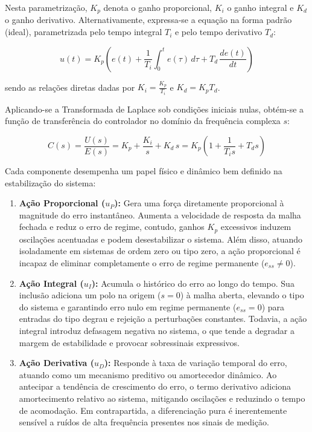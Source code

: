 Nesta parametrização, $K_p$ denota o ganho proporcional, $K_i$ o ganho integral e $K_d$ o ganho derivativo. Alternativamente, expressa-se a equação na forma padrão (ideal), parametrizada pelo tempo integral $T_i$ e pelo tempo derivativo $T_d$:

\begin{equation}
    u(t) = K_p \left( e(t) + \frac{1}{T_i} \int_{0}^{t} e(\tau) \, d\tau + T_d \, \frac{de(t)}{dt} \right)
    \label{eq:pid_padrao}
\end{equation}

\noindent sendo as relações diretas dadas por $K_i = \frac{K_p}{T_i}$ e $K_d = K_p T_d$.

Aplicando-se a Transformada de Laplace sob condições iniciais nulas, obtém-se a função de transferência do controlador no domínio da frequência complexa $s$:

\begin{equation}
    C(s) = \frac{U(s)}{E(s)} = K_p + \frac{K_i}{s} + K_d \, s = K_p \left( 1 + \frac{1}{T_i s} + T_d s \right)
    \label{eq:pid_laplace}
\end{equation}

Cada componente desempenha um papel físico e dinâmico bem definido na estabilização do sistema:

\begin{enumerate}
    \item \textbf{Ação Proporcional ($u_P$):} Gera uma força diretamente proporcional à magnitude do erro instantâneo. Aumenta a velocidade de resposta da malha fechada e reduz o erro de regime, contudo, ganhos $K_p$ excessivos induzem oscilações acentuadas e podem desestabilizar o sistema. Além disso, atuando isoladamente em sistemas de ordem zero ou tipo zero, a ação proporcional é incapaz de eliminar completamente o erro de regime permanente ($e_{ss} \neq 0$).
    \item \textbf{Ação Integral ($u_I$):} Acumula o histórico do erro ao longo do tempo. Sua inclusão adiciona um polo na origem ($s = 0$) à malha aberta, elevando o tipo do sistema e garantindo erro nulo em regime permanente ($e_{ss} = 0$) para entradas do tipo degrau e rejeição a perturbações constantes. Todavia, a ação integral introduz defasagem negativa no sistema, o que tende a degradar a margem de estabilidade e provocar sobressinais expressivos.
    \item \textbf{Ação Derivativa ($u_D$):} Responde à taxa de variação temporal do erro, atuando como um mecanismo preditivo ou amortecedor dinâmico. Ao antecipar a tendência de crescimento do erro, o termo derivativo adiciona amortecimento relativo ao sistema, mitigando oscilações e reduzindo o tempo de acomodação. Em contrapartida, a diferenciação pura é inerentemente sensível a ruídos de alta frequência presentes nos sinais de medição.
\end{enumerate}

